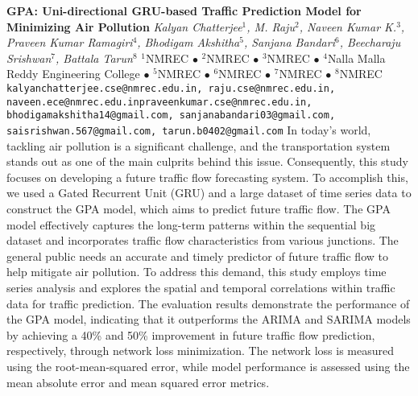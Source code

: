 
    \begin{conf-abstract}[]
        {\textbf{GPA: Uni-directional GRU-based Traffic Prediction Model for Minimizing Air Pollution}}
        {\textit{Kalyan Chatterjee$^{1}$, M.  Raju$^{2}$, Naveen  Kumar K.$^{3}$, Praveen Kumar Ramagiri$^{4}$, Bhodigam  Akshitha$^{5}$, Sanjana  Bandari$^{6}$, Beecharaju  Srishwan$^{7}$, Battala  Tarun$^{8}$}}
        {$^{1}$NMREC $\bullet$ $^{2}$NMREC $\bullet$ $^{3}$NMREC $\bullet$ $^{4}$Nalla Malla Reddy Engineering College $\bullet$ $^{5}$NMREC $\bullet$ $^{6}$NMREC $\bullet$ $^{7}$NMREC $\bullet$ $^{8}$NMREC}
        {\texttt{kalyanchatterjee.cse@nmrec.edu.in, raju.cse@nmrec.edu.in, naveen.ece@nmrec.edu.inpraveenkumar.cse@nmrec.edu.in, bhodigamakshitha14@gmail.com, sanjanabandari03@gmail.com, saisrishwan.567@gmail.com, tarun.b0402@gmail.com}}
        {In today's world, tackling air pollution is a significant challenge, and the transportation system stands out as one of the main culprits behind this issue. Consequently, this study focuses on developing a future traffic flow forecasting system. To accomplish this, we used a Gated Recurrent Unit (GRU) and a large dataset of time series data to construct the GPA model, which aims to predict future traffic flow. The GPA model effectively captures the long-term patterns within the sequential big dataset and incorporates traffic flow characteristics from various junctions. The general public needs an accurate and timely predictor of future traffic flow to help mitigate air pollution. To address this demand, this study employs time series analysis and explores the spatial and temporal correlations within traffic data for traffic prediction. The evaluation results demonstrate the performance of the GPA model, indicating that it outperforms the ARIMA and SARIMA models by achieving a 40\% and 50\% improvement in future traffic flow prediction, respectively, through network loss minimization. The network loss is measured using the root-mean-squared error, while model performance is assessed using the mean absolute error and mean squared error metrics.}
    \end{conf-abstract}
        